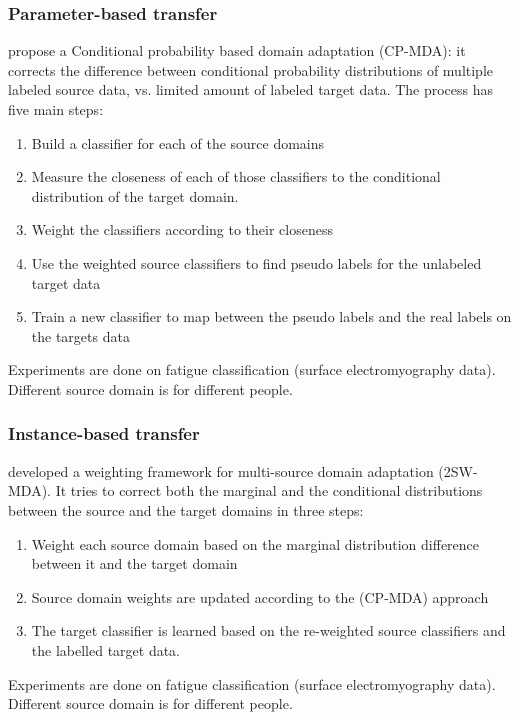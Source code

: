 
\subsubsection{Parameter-based transfer}
\citep{chattopadhyay2012multisource} propose a Conditional probability based domain adaptation (CP-MDA): it corrects the difference between conditional probability distributions of multiple labeled source data, vs. limited amount of labeled target data. The process has five main steps:
\begin{enumerate}
    \item Build a classifier for each of the source domains
    \item Measure the closeness of each of those classifiers to the conditional distribution of the target domain.
    \item Weight the classifiers according to their closeness
    \item Use the weighted source classifiers to find pseudo labels for the unlabeled target data
    \item Train a new classifier to map between the pseudo labels and the real labels on the targets data
\end{enumerate}
Experiments are done on fatigue classification (surface electromyography data). Different source domain is for different people.

\subsubsection{Instance-based transfer}
\citep{chattopadhyay2012multisource} developed a weighting framework for multi-source domain adaptation (2SW-MDA). It tries to correct both the marginal and the conditional distributions between the source and the target domains in three steps:
\begin{enumerate}
    \item Weight each source domain based on the marginal distribution difference between it and the target domain
    \item Source domain weights are updated according to the (CP-MDA) approach
    \item The target classifier is learned based on the re-weighted source classifiers and the labelled target data.
\end{enumerate}
Experiments are done on fatigue classification (surface electromyography data). Different source domain is for different people.

